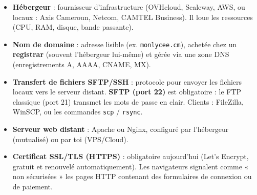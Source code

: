 \documentclass[11pt]{article}
\begin{document}
\begin{definition}
\begin{itemize}
    \item \textbf{Hébergeur} : fournisseur d'infrastructure (OVHcloud, Scaleway, AWS, ou locaux : Axis Cameroun, Netcom, CAMTEL Business). Il loue les ressources (CPU, RAM, disque, bande passante).
    \item \textbf{Nom de domaine} : adresse lisible (ex. \texttt{monlycee.cm}), achetée chez un \textbf{registrar} (souvent l'hébergeur lui-même) et gérée via une zone DNS (enregistrements A, AAAA, CNAME, MX).
    \item \textbf{Transfert de fichiers SFTP/SSH} : protocole pour envoyer les fichiers locaux vers le serveur distant. \textbf{SFTP (port 22)} est obligatoire : le FTP classique (port 21) transmet les mots de passe en clair. Clients : FileZilla, WinSCP, ou les commandes \texttt{scp} / \texttt{rsync}.
    \item \textbf{Serveur web distant} : Apache ou Nginx, configuré par l'hébergeur (mutualisé) ou par toi (VPS/Cloud).
    \item \textbf{Certificat SSL/TLS (HTTPS)} : obligatoire aujourd'hui (Let's Encrypt, gratuit et renouvelé automatiquement). Les navigateurs signalent comme « non sécurisées » les pages HTTP contenant des formulaires de connexion ou de paiement.
\end{itemize}
\end{definition}
\end{document}
